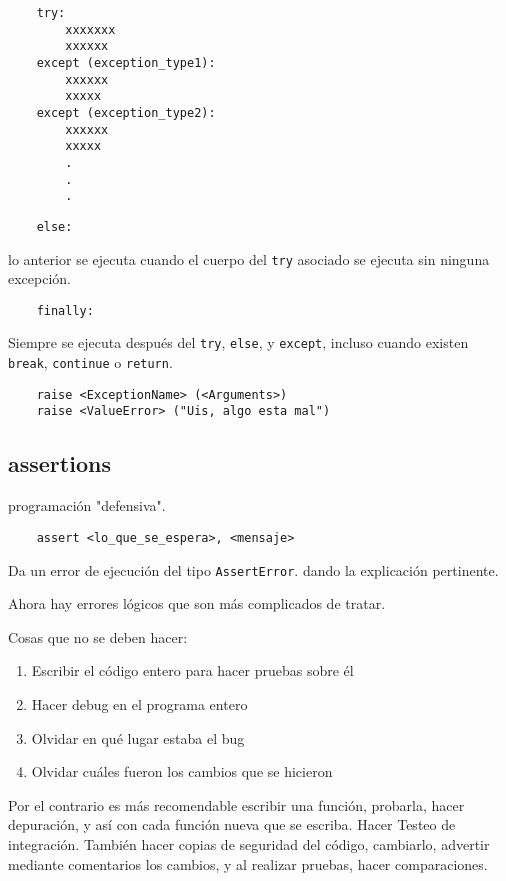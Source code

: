 \begin{verbatim}
    try:
        xxxxxxx
        xxxxxx
    except (exception_type1):
        xxxxxx
        xxxxx
    except (exception_type2):
        xxxxxx
        xxxxx
        .
        .
        .
\end{verbatim}

\begin{verbatim}
    else:
\end{verbatim}

lo anterior se ejecuta cuando el cuerpo del \texttt{try} asociado se ejecuta
sin ninguna excepción.

\begin{verbatim}
    finally:
\end{verbatim}

Siempre se ejecuta después del \texttt{try}, \texttt{else}, y \texttt{except},
incluso cuando existen \texttt{break}, \texttt{continue} o \texttt{return}.

\begin{verbatim}
    raise <ExceptionName> (<Arguments>)
    raise <ValueError> ("Uis, algo esta mal")
\end{verbatim}

\subsection{assertions}

programación "defensiva".

\begin{verbatim}
    assert <lo_que_se_espera>, <mensaje>
\end{verbatim}

Da un error de ejecución del tipo \texttt{AssertError}. dando la explicación
pertinente.

Ahora hay errores lógicos que son más complicados de tratar.

Cosas que no se deben hacer:

\begin{enumerate}
    \item Escribir el código entero para hacer pruebas sobre él
    \item Hacer debug en el programa entero
    \item Olvidar en qué lugar estaba el bug
    \item Olvidar cuáles fueron los cambios que se hicieron
\end{enumerate}

Por el contrario es más recomendable escribir una función, probarla, hacer
depuración, y así con cada función nueva que se escriba. Hacer Testeo de
integración.
También hacer copias de seguridad del código, cambiarlo, advertir mediante
comentarios los cambios, y al realizar pruebas, hacer comparaciones.

